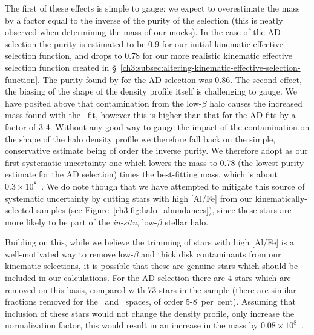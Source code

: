 The first of these effects is simple to gauge: we expect to overestimate the mass by a factor equal to the inverse of the purity of the selection (this is neatly observed when determining the mass of our mocks). In the case of the AD selection the purity is estimated to be 0.9 for our initial kinematic effective selection function, and drops to 0.78 for our more realistic kinematic effective selection function created in \S~\ref{ch3:subsec:altering-kinematic-effective-selection-function}. The purity found by \cite{lane22} for the AD selection was 0.86. The second effect, the biasing of the shape of the density profile itself is challenging to gauge. We have posited above that contamination from the low-$\beta$ halo causes the increased mass found with the \JRLz\ fit, however this is higher than that for the AD fits by a factor of 3-4. Without any good way to gauge the impact of the contamination on the shape of the \gse halo density profile we therefore fall back on the simple, conservative estimate being of order the inverse purity. We therefore adopt as our first systematic uncertainty one which lowers the mass to 0.78 (the lowest purity estimate for the AD selection) times the best-fitting mass, which is about $0.3\times10^{8}$~\Msun. We do note though that we have attempted to mitigate this source of systematic uncertainty by cutting stars with high [Al/Fe] from our kinematically-selected \gse samples (see Figure~\ref{ch3:fig:halo_abundances}), since these stars are more likely to be part of the \textit{in-situ}, low-$\beta$ stellar halo.

Building on this, while we believe the trimming of stars with high [Al/Fe] is a well-motivated way to remove low-$\beta$ and thick disk contaminants from our kinematic selections, it is possible that these are genuine \gse stars which should be included in our calculations. For the AD selection there are 4 stars which are removed on this basis, compared with 73 stars in the sample (there are similar fractions removed for the \eLz\ and \JRLz\ spaces, of order 5-8~per~cent). Assuming that inclusion of these stars would not change the density profile, only increase the normalization factor, this would result in an increase in the mass by $0.08\times10^{8}$~\Msun.

